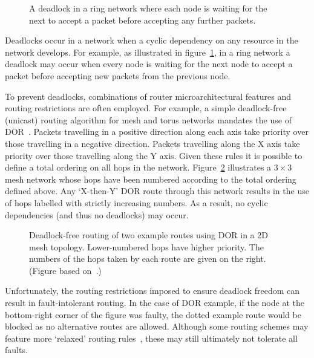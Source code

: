 			\begin{figure}
				\center
				
				\caption[A deadlock in a ring network.]%
				{A deadlock in a ring network where each node is waiting for
				the next to accept a packet before accepting any further packets.}
				\label{fig:ring-deadlock}
			\end{figure}
			
			Deadlocks occur in a network when a cyclic dependency on any resource in
			the network develops. For example, as illustrated in
			figure~\ref{fig:ring-deadlock}, in a ring network a deadlock may occur
			when every node is waiting for the next node to accept a packet before
			accepting new packets from the previous node.
			
			To prevent deadlocks, combinations of router microarchitectural features
			and routing restrictions are often employed. For example, a simple
			deadlock-free (unicast) routing algorithm for mesh and torus networks
			mandates the use of DOR~\cite[chapter~14]{dally04}. Packets travelling in
			a positive direction along each axis take priority over those travelling
			in a negative direction. Packets travelling along the X axis take
			priority over those travelling along the Y axis. Given these rules
			it is possible to define a total ordering on all hops in the network.
			Figure~\ref{fig:deadlock-free-dor} illustrates a $3\times3$ mesh network
			whose hops have been numbered according to the total ordering defined
			above.  Any `X-then-Y' DOR route through this network results in the use
			of hops labelled with strictly increasing numbers. As a result, no cyclic
			dependencies (and thus no deadlocks) may occur.
			
			\begin{figure}
				\center
			
				\caption[Deadlock-free routing using DOR in a 2D mesh topology.]%
				{Deadlock-free routing of two example routes using DOR in a 2D mesh
				topology. Lower-numbered hops have higher priority. The numbers of the
				hops taken by each route are given on the right. (Figure based
				on~\cite[figure~14.12]{dally04}.)}
				\label{fig:deadlock-free-dor}
			\end{figure}
			
			Unfortunately, the routing restrictions imposed to ensure deadlock
			freedom can result in fault-intolerant routing. In the case of DOR
			example, if the node at the bottom-right corner of the figure was faulty,
			the dotted example route would be blocked as no alternative routes are
			allowed. Although some routing schemes may feature more `relaxed' routing
			rules~\cite{rodrigo09}, these may still ultimately not tolerate all
			faults.
			
